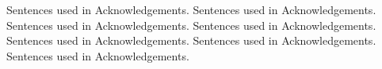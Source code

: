 Sentences used in Acknowledgements.
Sentences used in Acknowledgements.
Sentences used in Acknowledgements.
Sentences used in Acknowledgements.
Sentences used in Acknowledgements.
Sentences used in Acknowledgements.
Sentences used in Acknowledgements.